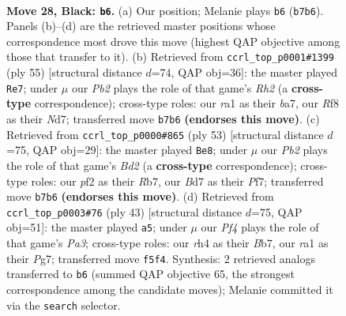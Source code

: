 \documentclass[11pt]{article}
\begin{document}
\begin{figure}[p]\centering
\begin{subfigure}{0.46\textwidth}\centering
\resizebox{\linewidth}{!}{%
\newchessgame
\chessboard[
  setfen={r2k1r1b/1ppb4/p2n4/3Npp2/P6R/1B3N2/1P2KPP1/R1B5 b - - 0 28},
  showmover=false,
  pgfstyle=straightmove, color=movearrow, markmove={b7-b6}
]}
\caption{}
\end{subfigure}\hfill
\begin{subfigure}{0.46\textwidth}\centering
\resizebox{\linewidth}{!}{%
\newchessgame
\chessboard[
  setfen={5k2/Bprn3r/p4pb1/P2B3p/1bN4p/1P6/4RPP1/3R2K1 b - - 1 28},
  showmover=false,
  pgfstyle=straightmove, color=movearrow, markmove={h7-e7}
]}
\caption{}
\end{subfigure}
\\[4pt]
\begin{subfigure}{0.46\textwidth}\centering
\resizebox{\linewidth}{!}{%
\newchessgame
\chessboard[
  setfen={3r2k1/1r1b1p2/2p1p2p/p5p1/Nn1P4/1B3P2/PP4PP/2RR2K1 b - - 1 27},
  showmover=false,
  pgfstyle=straightmove, color=movearrow, markmove={d7-e8}
]}
\caption{}
\end{subfigure}\hfill
\begin{subfigure}{0.46\textwidth}\centering
\resizebox{\linewidth}{!}{%
\newchessgame
\chessboard[
  setfen={4r1k1/1b2b1p1/p3pr1p/2n5/Pp1R4/4BN2/1P3PPP/R2B2K1 b - - 2 22},
  showmover=false,
  pgfstyle=straightmove, color=movearrow, markmove={a6-a5}
]}
\caption{}
\end{subfigure}
\caption{\textbf{Move 28, Black: \texttt{b6}.} (a) Our position; Melanie plays \texttt{b6} (\texttt{b7b6}). Panels (b)--(d) are the retrieved master positions whose correspondence most drove this move (highest QAP objective among those that transfer to it). (b) Retrieved from \texttt{ccrl\_top\_p0001\#1399} (ply 55) [structural distance $d$=74, QAP obj=36]: the master played \texttt{Re7}; under $\mu$ our \emph{Pb2} plays the role of that game's \emph{Rh2} (a \textbf{cross-type} correspondence); cross-type roles: our \emph{r}a1 as their \emph{b}a7, our \emph{R}f8 as their \emph{N}d7; transferred move \texttt{b7b6} \textbf{(endorses this move)}. (c) Retrieved from \texttt{ccrl\_top\_p0000\#865} (ply 53) [structural distance $d$=75, QAP obj=29]: the master played \texttt{Be8}; under $\mu$ our \emph{Pb2} plays the role of that game's \emph{Bd2} (a \textbf{cross-type} correspondence); cross-type roles: our \emph{p}f2 as their \emph{R}b7, our \emph{B}d7 as their \emph{P}f7; transferred move \texttt{b7b6} \textbf{(endorses this move)}. (d) Retrieved from \texttt{ccrl\_top\_p0003\#76} (ply 43) [structural distance $d$=75, QAP obj=51]: the master played \texttt{a5}; under $\mu$ our \emph{Pf4} plays the role of that game's \emph{Pa3}; cross-type roles: our \emph{r}h4 as their \emph{B}b7, our \emph{r}a1 as their \emph{P}g7; transferred move \texttt{f5f4}. Synthesis: 2 retrieved analogs transferred to \texttt{b6} (summed QAP objective 65, the strongest correspondence among the candidate moves); Melanie committed it via the \texttt{search} selector.}
\label{fig:thought-m55}
\end{figure}
\end{document}
